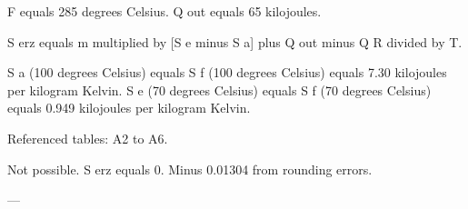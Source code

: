 F equals 285 degrees Celsius.  
Q out equals 65 kilojoules.  

S erz equals m multiplied by [S e minus S a] plus Q out minus Q R divided by T.  

S a (100 degrees Celsius) equals S f (100 degrees Celsius) equals 7.30 kilojoules per kilogram Kelvin.  
S e (70 degrees Celsius) equals S f (70 degrees Celsius) equals 0.949 kilojoules per kilogram Kelvin.  

Referenced tables: A2 to A6.  

Not possible.  
S erz equals 0.  
Minus 0.01304 from rounding errors.  

---
